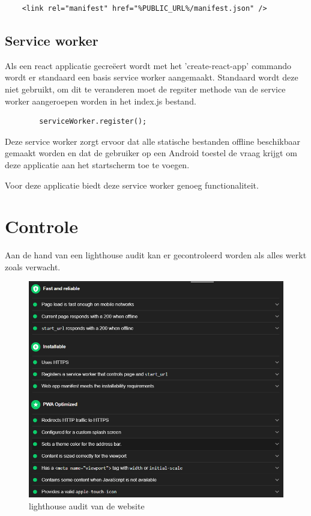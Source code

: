 \begin{lstlisting}
	<link rel="manifest" href="%PUBLIC_URL%/manifest.json" />
\end{lstlisting}
		
		
	\subsection{Service worker}
		
		Als een react applicatie gecreëert wordt met het 'create-react-app' commando wordt er standaard een basis service worker aangemaakt. Standaard wordt deze niet gebruikt, om dit te veranderen moet de regsiter methode van de service worker aangeroepen worden in het index.js bestand.
		
\begin{lstlisting}
		serviceWorker.register();
\end{lstlisting}
		
		Deze service worker zorgt ervoor dat alle statische bestanden offline beschikbaar gemaakt worden en dat de gebruiker op een Android toestel de vraag krijgt om deze applicatie aan het startscherm toe te voegen.
		
		Voor deze applicatie biedt deze service worker genoeg functionaliteit.
		

\section{Controle}

	Aan de hand van een lighthouse audit kan er gecontroleerd worden als alles werkt zoals verwacht.
	
	\begin{figure}[H]
		\centering
		\includegraphics{./img/lighthouse_dart.png}{}
		\caption{lighthouse audit van de website}
	\end{figure}


